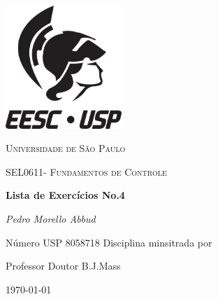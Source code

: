 \documentclass[12pt,a4paper]{article}
\begin{document}
\begin{titlepage}
  \centering
  \includegraphics[width=0.33\textwidth]{usp}\par\vspace{1cm}
  {\scshape\LARGE Universidade de São Paulo\par}
  \vspace{1cm}
  {\scshape\Large SEL0611- Fundamentos de Controle\par}
  \vspace{1.5cm}
  {\huge\bfseries Lista de Exercícios No.4\par}
  \vspace{2cm}
  {\Large\itshape Pedro Morello Abbud \par}
  \vspace{1cm}
  Número USP 8058718
  \vfill
  Disciplina minsitrada por\par
  Professor Doutor B.J.Mass

  \vfill 
  {\large \today\par}
\end{titlepage}
\newpage
\end{document}
